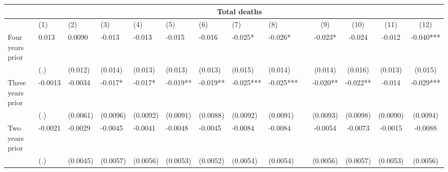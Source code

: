 \begin{tabular}{lccccrrrrrcccc}
\toprule
      & \multicolumn{13}{c}{Total deaths} \\
\midrule
      & \multicolumn{1}{l}{(1)} & \multicolumn{1}{l}{(2)} & \multicolumn{1}{l}{(3)} & \multicolumn{1}{l}{(4)} & \multicolumn{1}{l}{(5)} & \multicolumn{1}{l}{(6)} & \multicolumn{1}{l}{(7)} & \multicolumn{1}{l}{(8)} &       & (9)   & (10)  & (11)  & (12) \\
\midrule
\midrule
Four years prior & \multicolumn{1}{l}{0.013} & \multicolumn{1}{l}{0.0090} & \multicolumn{1}{l}{-0.013} & \multicolumn{1}{l}{-0.013} & \multicolumn{1}{l}{-0.015} & \multicolumn{1}{l}{-0.016} & \multicolumn{1}{l}{-0.025*} & \multicolumn{1}{l}{-0.026*} &       & -0.023* & -0.024 & -0.012 & -0.040*** \\
      & \multicolumn{1}{l}{(.)} & \multicolumn{1}{l}{(0.012)} & \multicolumn{1}{l}{(0.014)} & \multicolumn{1}{l}{(0.013)} & \multicolumn{1}{l}{(0.013)} & \multicolumn{1}{l}{(0.013)} & \multicolumn{1}{l}{(0.015)} & \multicolumn{1}{l}{(0.014)} &       & (0.014) & (0.016) & (0.013) & (0.015) \\
Three years prior & \multicolumn{1}{l}{-0.0013} & \multicolumn{1}{l}{-0.0034} & \multicolumn{1}{l}{-0.017*} & \multicolumn{1}{l}{-0.017*} & \multicolumn{1}{l}{-0.019**} & \multicolumn{1}{l}{-0.019**} & \multicolumn{1}{l}{-0.025***} & \multicolumn{1}{l}{-0.025***} &       & -0.020** & -0.022** & -0.014 & -0.029*** \\
      & \multicolumn{1}{l}{(.)} & \multicolumn{1}{l}{(0.0061)} & \multicolumn{1}{l}{(0.0096)} & \multicolumn{1}{l}{(0.0092)} & \multicolumn{1}{l}{(0.0091)} & \multicolumn{1}{l}{(0.0088)} & \multicolumn{1}{l}{(0.0092)} & \multicolumn{1}{l}{(0.0091)} &       & (0.0093) & (0.0098) & (0.0090) & (0.0094) \\
Two years prior & \multicolumn{1}{l}{-0.0021} & \multicolumn{1}{l}{-0.0029} & \multicolumn{1}{l}{-0.0045} & \multicolumn{1}{l}{-0.0041} & \multicolumn{1}{l}{-0.0048} & \multicolumn{1}{l}{-0.0045} & \multicolumn{1}{l}{-0.0084} & \multicolumn{1}{l}{-0.0084} &       & -0.0054 & -0.0073 & -0.0015 & -0.0088 \\
      & \multicolumn{1}{l}{(.)} & \multicolumn{1}{l}{(0.0045)} & \multicolumn{1}{l}{(0.0057)} & \multicolumn{1}{l}{(0.0056)} & \multicolumn{1}{l}{(0.0053)} & \multicolumn{1}{l}{(0.0052)} & \multicolumn{1}{l}{(0.0054)} & \multicolumn{1}{l}{(0.0054)} &       & (0.0056) & (0.0057) & (0.0053) & (0.0056) \\

\end{tabular}
